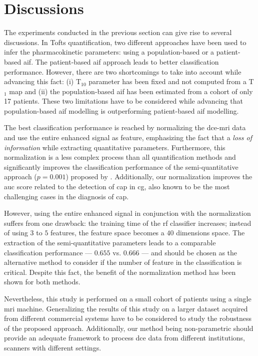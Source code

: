 \section{Discussions}\label{sec:discussions}

The experiments conducted in the previous section can give rise to several discussions.
In Tofts quantification, two different approaches have been used to infer the pharmacokinetic parameters: using a population-based or a patient-based \ac{aif}.
The patient-based \ac{aif} approach leads to better classification performance.
However, there are two shortcomings to take into account while advancing this fact:
(i) T$_{10}$ parameter has been fixed and not computed from a T$_1$ map and
(ii) the population-based \ac{aif} has been estimated from a cohort of only 17 patients.
These two limitations have to be considered while advancing that population-based \ac{aif} modelling is outperforming patient-based \ac{aif} modelling.

The best classification performance is reached by normalizing the \ac{dce}-\ac{mri} data and use the entire enhanced signal as feature, emphasizing the fact that a \emph{loss of information} while extracting quantitative parameters.
Furthermore, this normalization is a less complex process than all
quantification methods and significantly improves the classification
performance of the semi-quantitative approach ($p=0.001$) proposed by
\citeauthor{huisman2001accurate}.
Additionally, our normalization improves the \ac{auc} score related to
the detection of \ac{cap} in \ac{cg}, also known to be the most
challenging cases in the diagnosis of \ac{cap}.

However, using the entire enhanced signal in conjunction with the
normalization suffers from one drawback: the training time of the
\ac{rf} classifier increases; instead of using $3$ to $5$ features, the
feature space becomes a $40$ dimensions space. The extraction of the
semi-quantitative parameters leads to a comparable classification performance ---
$0.655$ vs. $0.666$ --- and should be chosen as the alternative method to
consider if the number of feature in the classification is
critical. Despite this fact, the benefit of the normalization method
has been shown for both methods.

Nevertheless, this study is performed on a small cohort of patients using a single \ac{mri} machine.
Generalizing the results of this study on a larger dataset acquired from different commercial systems have to be considered to study the robustness of the proposed approach.
Additionally, our method being non-parametric should provide an
adequate framework to process \ac{dce} data from different
institutions, scanners with different settings.


